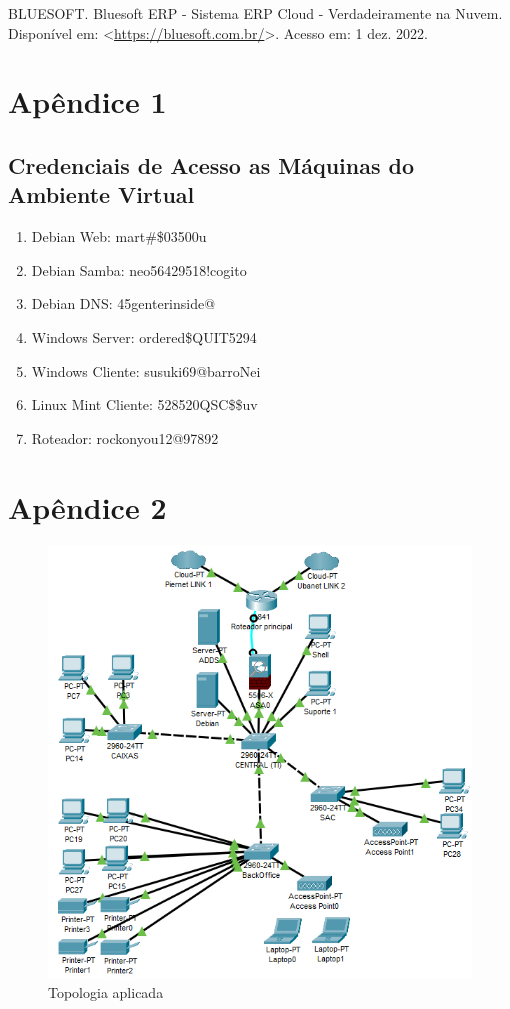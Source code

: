 \documentclass[12pt]{article}
\begin{document}
BLUESOFT. Bluesoft ERP - Sistema ERP Cloud - Verdadeiramente na Nuvem. Disponível em: <\url{https://bluesoft.com.br/}>. Acesso em: 1 dez. 2022.

\newpage

\section{Apêndice 1}

\subsection{Credenciais de Acesso as Máquinas do Ambiente Virtual}

\begin{enumerate}
   \item Debian Web: mart\#\$03500u
   \item Debian Samba: neo56429518!cogito
   \item Debian DNS: 45genterinside@
   \item Windows Server: ordered\$QUIT5294
   \item Windows Cliente: susuki69@barroNei
   \item Linux Mint Cliente: 528520QSC\$\$uv
   \item Roteador: rockonyou12@97892
\end{enumerate}

\newpage

\section{Apêndice 2}

\begin{figure}[ht]
    \centering
    \includegraphics[height=0.7\textwidth]{cisco01.jpeg}
    \caption{Topologia aplicada}
    \label{fig:cisco-topologia}
\end{figure}
\end{document}
